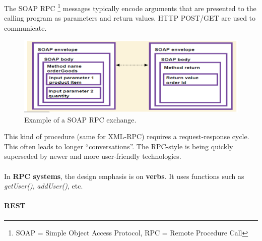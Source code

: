 The SOAP RPC \footnote{SOAP = Simple Object Access Protocol, RPC = Remote Procedure Call} messages typically encode arguments that are presented to the calling program as parameters and return values. HTTP POST/GET are used to communicate.
\begin{figure}[H]%
 \centering
 \includegraphics[width=13cm]{./img/04/soap-rpc}
 \caption{\label{pic:soap-rpc} Example of a SOAP RPC exchange.}
\end{figure}
This kind of procedure (same for XML-RPC) requires a request-response cycle. This often leads to longer ``conversations''. The RPC-style is being quickly superseded by newer and more user-friendly technologies.\\\\
In {\bf RPC systems}, the design emphasis is on {\bf verbs}. It uses functions such as {\it getUser()}, {\it addUser()}, etc.


\paragraph{REST}

